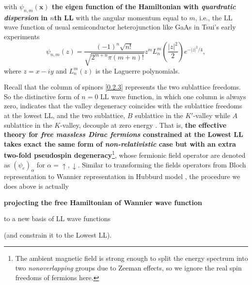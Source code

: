 \documentclass[bachelor,english,numbers]{ustcthesis}
\begin{document}
			with {\bf $\psi_{n,m}(\bm{x})$ the eigen function of the Hamiltonian with \emph{quardratic dispersion} in $n$th LL} with the angular momentum equal to $m$, i.e., the LL wave function of usual semiconductor heterojunction like GaAs in Tsui's early experiments \cite{tsui1982two,tHoke20074}
			\begin{equation*}
				\psi_{n,m}(z)=\dfrac{(-1)^n\sqrt{n!}}{\sqrt{2^{m+n}\pi (m+n)!}}z^m L_n^m\left(\dfrac{|z|^2}{2}\right)e^{-|z|^2/4},
			\end{equation*}
			where $z=x-iy$ and $L_n^m(z)$ is the Laguerre polynomials.\par
			Recall that the column of spinors \eqref{0.2.3} represents the two sublattice freedoms. So the distinctive form of $n=0$ LL wave function, in which one column is always zero, indicates that the valley degeneracy coincides with the sublattice freedoms at the lowest LL, and the two sublattice, $B$ sublattice in the $K'$-valley while $A$ sublattice in the $K$-valley, decouple at zero energy \cite{goerbig2011electronic}. That is, {\bf the effective theory for \emph{free massless Dirac fermions} constrained at the Lowest LL takes exact the same form of \emph{non-relativistic} case but with an extra two-fold pseudospin degeneracy}\footnote{The ambient magnetic field is strong enough to split the energy spectrum into two \emph{nonoverlapping} groups due to Zeeman effects, so we ignore the real spin freedoms of fermions here.}, whose fermionic field operator are denoted as $(\psi_e)_\alpha$ for $\alpha=\uparrow,\downarrow$. Similar to transforming the fields operators from Bloch representation to Wannier representation in Hubburd model \cite{nagaosa1999quantum}, the procedure we does above is actually {\bf projecting the free Hamiltonian of Wannier wave function

			to a new basis of LL wave functions} (and constrain it to the Lowest LL).\par
		
\end{document}
